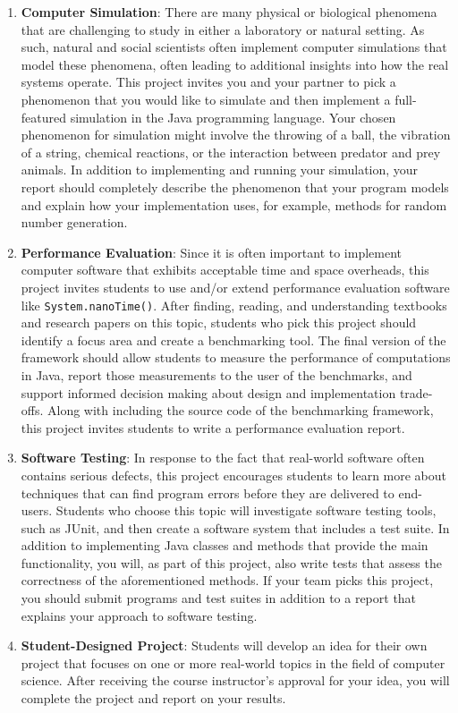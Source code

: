 \documentclass[11pt]{article}
\newcommand{\program}[1]{\lstinline{#1}}
\begin{document}
\begin{enumerate}
  \item {\bf Computer Simulation}: There are many physical or biological phenomena that are challenging to study in
    either a laboratory or natural setting. As such, natural and social scientists often implement computer simulations
    that model these phenomena, often leading to additional insights into how the real systems operate. This project
    invites you and your partner to pick a phenomenon that you would like to simulate and then implement a full-featured
    simulation in the Java programming language. Your chosen phenomenon for simulation might involve the throwing of a
    ball, the vibration of a string, chemical reactions, or the interaction between predator and prey animals. In
    addition to implementing and running your simulation, your report should completely describe the phenomenon that
    your program models and explain how your implementation uses, for example, methods for random number generation.

  \item {\bf Performance Evaluation}: Since it is often important to implement computer software that exhibits
    acceptable time and space overheads, this project invites students to use and/or extend performance evaluation
    software like \program{System.nanoTime()}. After finding, reading, and understanding textbooks and research papers
    on this topic, students who pick this project should identify a focus area and create a benchmarking tool. The final
    version of the framework should allow students to measure the performance of computations in Java, report those
    measurements to the user of the benchmarks, and support informed decision making about design and implementation
    trade-offs. Along with including the source code of the benchmarking framework, this project invites students to
    write a performance evaluation report.

  \item {\bf Software Testing}: In response to the fact that real-world software often contains serious defects, this
    project encourages students to learn more about techniques that can find program errors before they are delivered to
    end-users. Students who choose this topic will investigate software testing tools, such as JUnit, and then create
    a software system that includes a test suite. In addition to implementing Java classes and methods that provide the
    main functionality, you will, as part of this project, also write tests that assess the correctness of the
    aforementioned methods. If your team picks this project, you should submit programs and test suites in
    addition to a report that explains your approach to software testing.

  \item {\bf Student-Designed Project}: Students will develop an idea for their own project that focuses on one or more
    real-world topics in the field of computer science. After receiving the course instructor's approval for your idea,
    you will complete the project and report on your results.

\end{enumerate}
\end{document}

